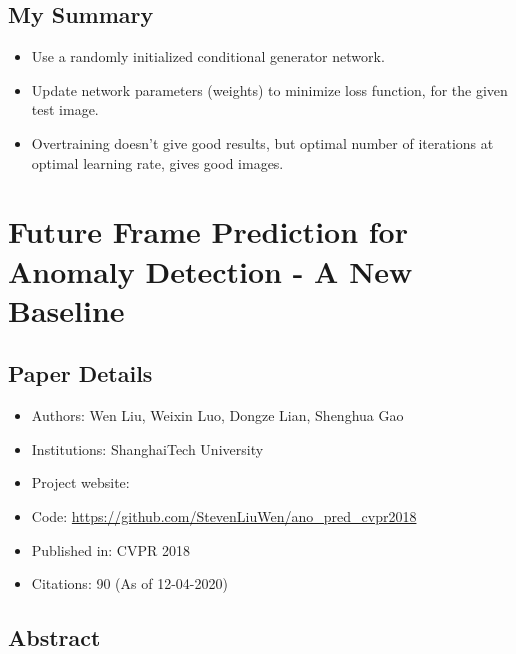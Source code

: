 \documentclass{article}
\begin{document}
    \subsection{My Summary}\label{subsec:Deep_Image_Prior:my-summary}
    \begin{itemize}
        \item Use a randomly initialized conditional generator network.
        \item Update network parameters (weights) to minimize loss function, for the given test image.
        \item Overtraining doesn't give good results, but optimal number of iterations at optimal learning rate, gives good images.
    \end{itemize}
    \newpage


    \section{Future Frame Prediction for Anomaly Detection - A New Baseline}\label{sec:Future_Frame_Prediction_for_Anomaly_Detection_A_New_Baseline}
    \subsection*{Paper Details}
    \begin{itemize}
        \item Authors: Wen Liu, Weixin Luo, Dongze Lian, Shenghua Gao
        \item Institutions: ShanghaiTech University
        \item Project website:
        \item Code: \url{https://github.com/StevenLiuWen/ano_pred_cvpr2018}
        \item Published in: CVPR 2018
        \item Citations: 90 (As of 12-04-2020)
    \end{itemize}

    \subsection*{Abstract}
\end{document}
